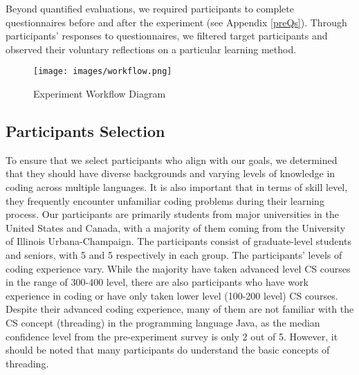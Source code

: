\documentclass[manuscript,screen,nonacm]{acmart}
\begin{document}
Beyond quantified evaluations, we required participants to complete questionnaires before and after the experiment (see Appendix \ref{preQs}). Through participants' responses to questionnaires, we filtered target participants and observed their voluntary reflections on a particular learning method.


\begin{figure}[t!]
  \centering
  \texttt{[image: images/workflow.png]}
  \caption{Experiment Workflow Diagram}
  \label{fig:workflow}
\end{figure}


\subsection{Participants Selection}
To ensure that we select participants who align with our goals, we determined that they should have diverse backgrounds and varying levels of knowledge in coding across multiple languages. It is also important that in terms of skill level, they frequently encounter unfamiliar coding problems during their learning process. Our participants are primarily students from major universities in the United States and Canada, with a majority of them coming from the University of Illinois Urbana-Champaign. The participants consist of graduate-level students and seniors, with 5 and 5 respectively in each group. The participants' levels of coding experience vary. While the majority have taken advanced level CS courses in the range of 300-400 level, there are also participants who have work experience in coding or have only taken lower level (100-200 level) CS courses. Despite their advanced coding experience, many of them are not familiar with the CS concept (threading) in the programming language Java, as the median confidence level from the pre-experiment survey is only 2 out of 5. However, it should be noted that many participants do understand the basic concepts of threading.
\end{document}
